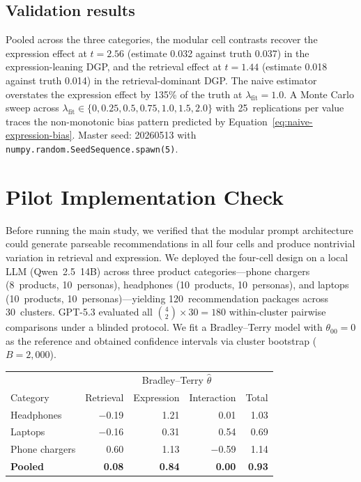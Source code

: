 \documentclass[11pt]{article}
\begin{document}
\subsection{Validation results}

Pooled across the three categories, the modular cell contrasts recover the expression effect at $t = 2.56$ (estimate 0.032 against truth 0.037) in the expression-leaning DGP, and the retrieval effect at $t = 1.44$ (estimate 0.018 against truth 0.014) in the retrieval-dominant DGP. The naive estimator overstates the expression effect by 135\% of the truth at $\lambda_{\mathrm{fit}} = 1.0$. A Monte Carlo sweep across $\lambda_{\mathrm{fit}} \in \{0, 0.25, 0.5, 0.75, 1.0, 1.5, 2.0\}$ with 25~replications per value traces the non-monotonic bias pattern predicted by Equation~\eqref{eq:naive-expression-bias}. Master seed: 20260513 with \texttt{numpy.random.SeedSequence.spawn(5)}.

\section{Pilot Implementation Check}\label{section:pilot}

Before running the main study, we verified that the modular prompt architecture could generate parseable recommendations in all four cells and produce nontrivial variation in retrieval and expression. We deployed the four-cell design on a local LLM (Qwen~2.5~14B) across three product categories---phone chargers (8~products, 10~personas), headphones (10~products, 10~personas), and laptops (10~products, 10~personas)---yielding 120~recommendation packages across 30~clusters. GPT-5.3 evaluated all $\binom{4}{2} \times 30 = 180$ within-cluster pairwise comparisons under a blinded protocol. We fit a Bradley--Terry model \citep{bradley1952rank} with $\theta_{00} = 0$ as the reference and obtained confidence intervals via cluster bootstrap ($B = 2{,}000$).

\begin{center}
\small
\begin{tabular}{lrrrr}
\toprule
& \multicolumn{4}{c}{Bradley--Terry $\hat{\theta}$} \\
Category & Retrieval & Expression & Interaction & Total \\
\midrule
Headphones    & $-$0.19 & 1.21 & 0.01 & 1.03 \\
Laptops       & $-$0.16 & 0.31 & 0.54 & 0.69 \\
Phone chargers & 0.60  & 1.13 & $-$0.59 & 1.14 \\
\midrule
\textbf{Pooled} & \textbf{0.08} & \textbf{0.84} & \textbf{0.00} & \textbf{0.93} \\
\bottomrule
\end{tabular}
\end{center}
\end{document}
